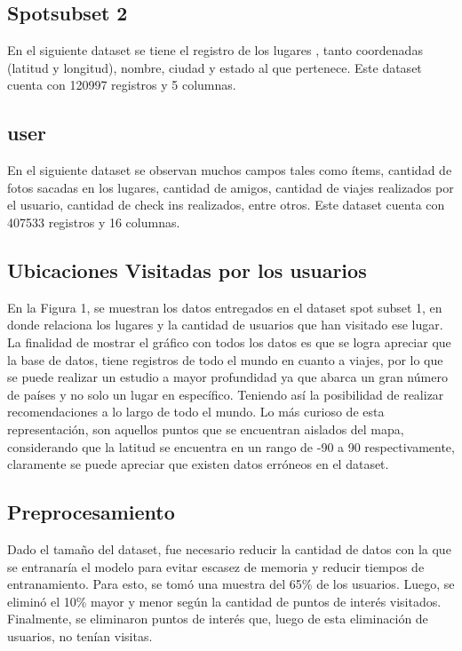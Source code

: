 \documentclass[sigplan,screen]{acmart}
\begin{document}
\subsection{Spotsubset 2}
En el siguiente dataset se tiene el registro de los lugares , tanto coordenadas (latitud y longitud), nombre, ciudad y estado al que pertenece. Este dataset cuenta con 120997 registros y 5 columnas.

\subsection{user}
En el siguiente dataset se observan muchos campos tales como ítems, cantidad de fotos sacadas en los lugares, cantidad de amigos, cantidad de viajes realizados por el usuario, cantidad de check ins realizados, entre otros. Este dataset cuenta con 407533 registros y 16 columnas.

\subsection{Ubicaciones Visitadas por los usuarios}
En la Figura 1, se muestran los datos entregados en el dataset spot subset 1, en donde relaciona los lugares y la cantidad de usuarios que han visitado ese lugar. La finalidad de mostrar el gráfico con todos los datos es que se logra apreciar que la base de datos, tiene registros de todo el mundo en cuanto a viajes, por lo que se puede realizar un estudio a mayor profundidad ya que abarca un gran número de países y no solo un lugar en específico. Teniendo así la posibilidad de realizar recomendaciones a lo largo de todo el mundo. Lo más curioso de esta representación, son aquellos puntos que se encuentran aislados del mapa, considerando que la latitud se encuentra en un rango de -90 a 90 respectivamente, claramente se puede apreciar que existen datos erróneos en el dataset. 

\subsection{Preprocesamiento}
Dado el tamaño del dataset, fue necesario reducir la cantidad de datos con la que se entranaría el modelo para evitar escasez de memoria y reducir tiempos de entranamiento. Para esto, se tomó una muestra del 65\% de los usuarios. Luego, se eliminó el 10\% mayor y menor según la cantidad de puntos de interés visitados. Finalmente, se eliminaron puntos de interés que, luego de esta eliminación de usuarios, no tenían visitas.
\end{document}
